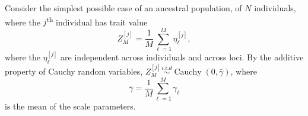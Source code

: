 \documentclass{article}
\newcommand{\iid}{\overset{i.i.d}{\sim}}
\newcommand{\1}{\mathbbm{1}}
\DeclareMathOperator*{\Cauchy}{Cauchy}
\theoremstyle{remark}
\theoremstyle{definition}
\begin{document}

Consider the simplest possible case of an ancestral population, of $N$ individuals, where the $j$\textsuperscript{th} individual has trait value 
\[
	Z^{[j]}_{M} = \frac{1}{M} \sum_{\ell = 1}^{M}  \eta^{[j]}_{\ell},
\]
where the $\eta^{[j]}_{\ell}$ are independent across individuals and across loci.  By the additive property of Cauchy random variables, $Z^{[j]}_M \iid \Cauchy(0,\bar{\gamma})$, where 
\[
	\bar{\gamma} = \frac{1}{M} \sum_{\ell = 1}^{M} \gamma_{\ell}
\]
is the mean of the scale parameters.  
\end{document}
